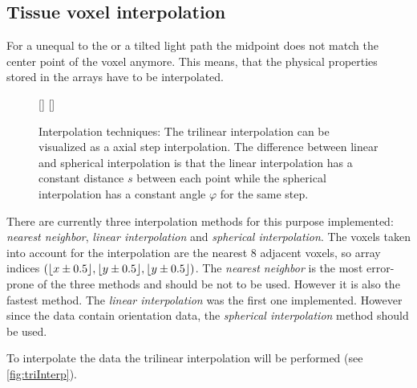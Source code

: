 \subsection{Tissue voxel interpolation}
%
For a \Stepsize{} unequal to the \Voxelsize{} or a tilted light path the midpoint does not match the center point of the voxel anymore.
This means, that the physical properties stored in the arrays have to be interpolated.
%
\begin{figure}[!t]
\centering
\setlength{\tikzwidth}{0.45\textwidth}
[\tikzwidth]{
\hfill{}\hfill}\hfill
{}[\tikzwidth]{
}
\caption[]{Interpolation techniques: The trilinear interpolation can be visualized as a axial step interpolation. The difference between linear and spherical interpolation is that the linear interpolation has a constant distance $s$ between each point while the spherical interpolation has a constant angle $\varphi$ for the same step.}
\label{fig:vectorfield_disc}
\end{figure}
%
There are currently three interpolation methods for this purpose implemented: \textit{nearest neighbor}, \textit{linear interpolation} and \textit{spherical interpolation}.
The voxels taken into account for the interpolation are the nearest 8 adjacent voxels, so array indices $(\lfloor x\pm0.5\rfloor,\lfloor y\pm0.5\rfloor,\lfloor y\pm0.5\rfloor)$.
%
The \textit{nearest neighbor} is the most error-prone of the three methods and should be not to be used.
However it is also the fastest method.
The \textit{linear interpolation} was the first one implemented.
However since the data contain orientation data, the \textit{spherical interpolation} method should be used.
\par
%
To interpolate the data the trilinear interpolation will be performed (see \cref{fig:triInterp}).
%
%
%
